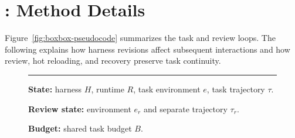 \section{\boxbox{}: Method Details}
\label{app:boxbox}

Figure~\ref{fig:boxbox-pseudocode} summarizes the task and review loops.
The following explains how harness revisions affect subsequent interactions
and how review, hot reloading, and recovery preserve task continuity.

\begin{figure}[H]
  \centering
\begingroup
\small
{}
\setlength{\parindent}{0pt}
\newenvironment{pseudocode}{%
  \begin{list}{\color{gray}\scriptsize\arabic{enumi}}{%
    \usecounter{enumi}
    \setlength{\leftmargin}{1.7em}
    \setlength{\labelwidth}{1.2em}
    \setlength{\labelsep}{.5em}
    \setlength{\itemsep}{1.5pt}
    \setlength{\parsep}{0pt}
    \setlength{\topsep}{4pt}}%
}{\end{list}}
\newcommand{\Line}[2]{\item\hspace*{#1em}#2}
\newcommand{\kw}[1]{\textbf{#1}}
\begin{minipage}{\linewidth}
{\normalsize\bfseries\color{heading} \boxbox{}}
\par\vspace{5pt}\hrule\vspace{6pt}
\textbf{State:} harness $H$, runtime $R$, task environment $e$, task trajectory $\tau$.
\par\textbf{Review state:} environment $e_r$ and separate trajectory $\tau_r$.
\par\textbf{Budget:} shared task budget $B$.


\end{minipage}
\end{figure}
